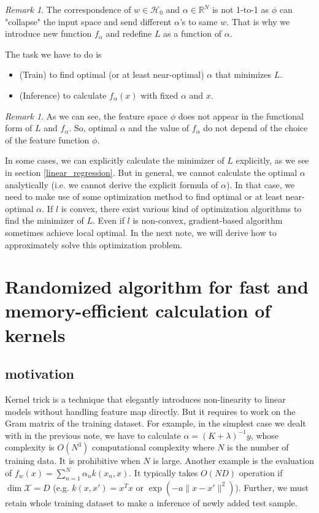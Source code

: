 \documentclass{amsart}
\theoremstyle{definition}
\theoremstyle{remark}
\newtheorem{remark}[theorem]{Remark}
\numberwithin{equation}{section}
\begin{document}
\begin{remark}
The correspondence of $w\in \mathcal{H}_0$ and $\alpha\in \mathbb{R}^N$ is not 1-to-1 as $\phi$ can "collapse" the input space and send different $\alpha$'s to same $w$.
That is why we introduce new function $f_\alpha$ and redefine $L$ as a function of $\alpha$.
\end{remark}

The task we have to do is
\begin{itemize}
\item (Train) to find optimal (or at least near-optimal) $\alpha$ that minimizes $L$.
\item (Inference) to calculate $f_\alpha(x)$ with fixed $\alpha$ and $x$.
\end{itemize}
\begin{remark}
As we can see, the feature space $\phi$ does not appear in the functional form of $L$ and $f_\alpha$.
So, optimal $\alpha$ and the value of $f_\alpha$ do not depend of the choice of the feature function $\phi$.

\end{remark}

In some cases, we can explicitly calculate the minimizer of $L$ explicitly, as we see in section \ref{linear_regression}.
But in general, we cannot calculate the optimal $\alpha$ analytically (i.e. we cannot derive the explicit formula of $\alpha$).
In that case, we need to make use of some optimization method to find optimal or at least near-optimal $\alpha$.
If $l$ is convex, there exist various kind of optimization algorithms to find the minimizer of $L$.
Even if $l$ is non-convex, gradient-based algorithm sometimes achieve local optimal.
In the next note, we will derive how to approximately solve this optimization problem.


\section{Randomized algorithm for fast and memory-efficient calculation of kernels}

\subsection{motivation}

Kernel trick is a technique that elegantly introduces non-linearity to linear models without handling feature map directly.
But it requires to work on the Gram matrix of the training dataset.
For example, in the simplest case we dealt with in the previous note,
we have to calculate $\alpha = (K + \lambda)^{-1}y$, whose complexity is $O(N^3)$ computational complexity where $N$ is the number of training data.
It is prohibitive when $N$ is large.
Another example is the evaluation of $f_w(x) = \sum_{n=1}^N \alpha_n k(x_n, x)$.
It typically takes $O(ND)$ operation if $\dim\mathcal{X} = D$ (e.g. $k(x, x')=x^Tx$ or $\exp(-a\|x-x'\|^2)$).
Further, we must retain whole training dataset to make a inference of newly added test sample.
\end{document}
